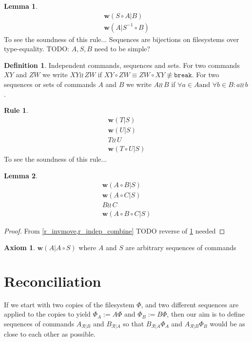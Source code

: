 \documentclass[12pt]{article}
\newcommand{\FS}{\Phi} %
\newcommand{\cbrk}{\mathtt{break}}
\newcommand{\fscommand}[2]{{#1#2}}
\newcommand{\cxy}{\fscommand{X}{Y}}
\newcommand{\czw}{\fscommand{Z}{W}}
\newcommand{\cc}{\circ} %
\newcommand{\nequiv}{\not\equiv}
\newcommand{\indep}{\wr\!\!\wr\,} %
\newcommand{\worksc}[2]{{\mathbf{w}}({#1}|{#2})}
\newcommand{\recchar}[3]{{#1}^{#3}_{\mathcal{R}|{#2}}}
\newcommand{\reca}{\recchar{A}{B}{}} %
\newcommand{\recb}{\recchar{B}{A}{}}
\newcommand{\infer}[2]{\begin{array}{c}{#1}\\\hline{#2}\end{array}}
\newcommand{\inferrr}[4]{\begin{array}{c}{#1}\\{#2}\\{#3}\\\hline{#4}\end{array}}
\theoremstyle{definition}
\newtheorem{mydef}{Definition}
\newtheorem{myax}{Axiom}
\newtheorem{mylem}{Lemma}
\newtheorem{myrul}{Rule}
\begin{document}
\begin{mylem}\label{r_invmove}
\[ \infer{\worksc{S\cc A}{B}}{\worksc{A}{S^{-1}\cc B}} \]
To see the soundness of this rule...
Sequences are bijections on filesystems over type-equality.
TODO: $A,S,B$ need to be simple?
\end{mylem}



\begin{mydef}{Independent commands, sequences and sets.}
For two commands $\cxy$ and $\czw$ we write $\cxy\indep\czw$ if $\cxy\cc \czw\equiv\czw\cc \cxy\nequiv\cbrk$.
For two sequences or sets of commands $A$ and $B$ we write $A\indep B$ if
$\forall a\in A \mbox{and~} \forall b\in B: a\indep b$.
\end{mydef}

\begin{myrul}\label{r_indep_combine}
\[ \inferrr{\worksc{T}{S}}{\worksc{U}{S}}{T\indep U}{\worksc{T\cc U}{S}} \]
To see the soundness of this rule...
\end{myrul}

\begin{mylem}\label{indep_prefix_combine}
\[ \inferrr{\worksc{A\cc B}{S}}{\worksc{A\cc C}{S}}{B\indep C}{\worksc{A\cc B\cc C}{S}} \]
\end{mylem}
\begin{proof}
From \cref{r_invmove,r_indep_combine}
TODO reverse of \cref{r_invmove} needed
\end{proof}


\begin{myax}\label{worksextpostfix}
$\worksc{A}{A\cc S}$ where $A$ and $S$ are arbitrary sequences of commands
\end{myax}
















\section{Reconciliation}

If we start with two copies of the filesystem $\FS$,
and two different sequences are applied to the copies to yield $\FS_A:=A\FS$
and $\FS_B:=B\FS$, then our aim is to define sequences of commands $\reca$ and $\recb$
so that $\recb\FS_A$ and $\reca\FS_B$ would be as close to each other as possible.
\end{document}
